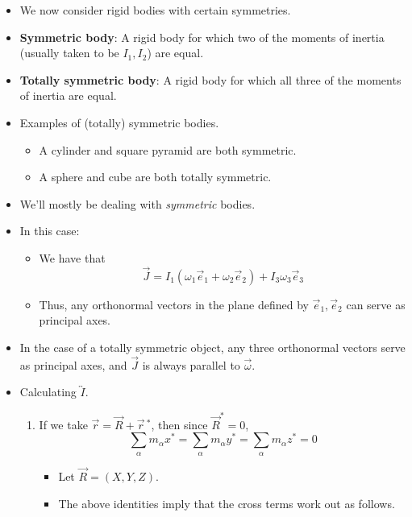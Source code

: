 \documentclass[../notes.tex]{subfiles}
\begin{document}
\begin{itemize}
    \item We now consider rigid bodies with certain symmetries.
    \item \textbf{Symmetric body}: A rigid body for which two of the moments of inertia (usually taken to be $I_1,I_2$) are equal.
    \item \textbf{Totally symmetric body}: A rigid body for which all three of the moments of inertia are equal.
    \item Examples of (totally) symmetric bodies.
    \begin{itemize}
        \item A cylinder and square pyramid are both symmetric.
        \item A sphere and cube are both totally symmetric.
    \end{itemize}
    \item We'll mostly be dealing with \emph{symmetric} bodies.
    \item In this case:
    \begin{itemize}
        \item We have that
        \begin{equation*}
            \vec{J} = I_1(\omega_1\vec{e}_1+\omega_2\vec{e}_2)+I_3\omega_3\vec{e}_3
        \end{equation*}
        \item Thus, any orthonormal vectors in the plane defined by $\vec{e}_1,\vec{e}_2$ can serve as principal axes.
    \end{itemize}
    \item In the case of a totally symmetric object, any three orthonormal vectors serve as principal axes, and $\vec{J}$ is always parallel to $\vec{\omega}$.
    \item Calculating $\overleftrightarrow{I}$.
    \begin{enumerate}
        \item If we take $\vec{r}=\vec{R}+\vec{r}{\,}^*$, then since $\vec{R}^*=0$,
        \begin{equation*}
            \sum_\alpha m_\alpha x^* = \sum_\alpha m_\alpha y^* = \sum_\alpha m_\alpha z^* = 0
        \end{equation*}
        \begin{itemize}
            \item Let $\vec{R}=(X,Y,Z)$.
            \item The above identities imply that the cross terms work out as follows.
            \begin{equation*}

\end{equation*}
\end{itemize}
\end{enumerate}
\end{itemize}
\end{document}
